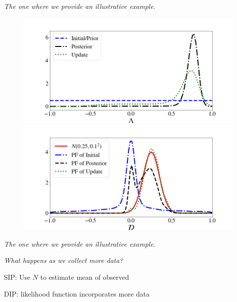 \begin{frame}{\it The one where we provide an illustrative example.}

\begin{figure}
\centering
   \includegraphics[width=0.65\linewidth]{figures/bip-vs-sip-1.png}
   \includegraphics[width=0.65\linewidth]{figures/bip-vs-sip-pf-1.png}
 \label{fig:bayes-comparison}
\end{figure}

\end{frame}


\begin{frame}{\it The one where we provide an illustrative example.}

\centering
\emph{What happens as we collect more data?}
\bigskip

\bigskip
SIP: Use $N$ to estimate mean of observed

\bigskip
DIP: likelihood function incorporates more data

\end{frame}

